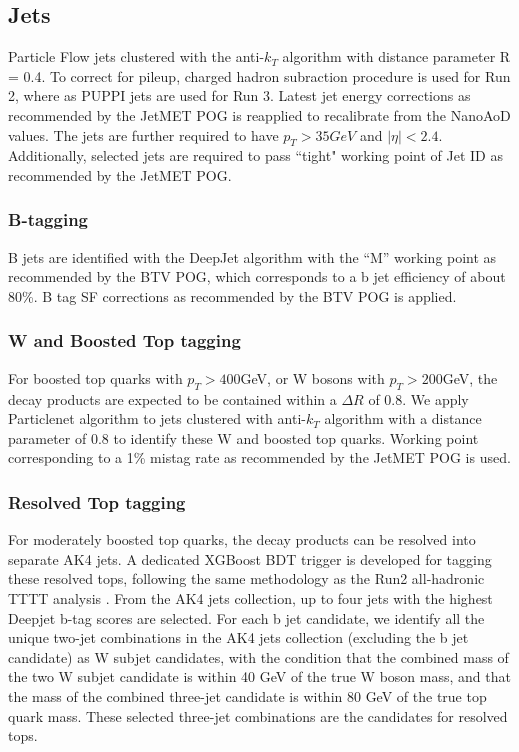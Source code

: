 \documentclass[twoside]{article}
\begin{document}
\subsection{Jets}
Particle Flow jets clustered with the anti-$k_T$ algorithm with distance parameter R = 0.4. To correct for pileup, charged hadron subraction procedure is used for Run 2, where as PUPPI jets are used for Run 3. Latest jet energy corrections as recommended by the JetMET POG is reapplied to recalibrate from the NanoAoD values. The jets are further required to have $p_T > 35 GeV$ and $\left| \eta \right| <2.4$. Additionally, selected jets are required to pass ``tight" working point of Jet ID as recommended by the JetMET POG.

\subsubsection{B-tagging}

B jets are identified with the DeepJet algorithm with the ``M'' working point as recommended by the BTV POG, which corresponds to a b jet efficiency of about 80\%. B tag SF corrections as recommended by the BTV POG is applied.

\subsubsection{W and Boosted Top tagging}

For boosted top quarks with $p_T > 400$GeV, or W bosons with $p_T > 200$GeV, the decay products are expected to be contained within a $\Delta R $ of 0.8. We apply Particlenet algorithm to jets clustered with anti-$k_T$ algorithm with a distance parameter of 0.8 to identify these W and boosted top quarks. Working point corresponding to a 1\% mistag rate as recommended by the JetMET POG is used.  

\subsubsection{Resolved Top tagging}
\label{sec:restop}

For moderately boosted top quarks, the decay products can be resolved into separate AK4 jets. A dedicated XGBoost BDT trigger is developed for tagging these resolved tops, following the same methodology as the Run2 all-hadronic TTTT analysis \cite{prev_analysis}. From the AK4 jets collection, up to four jets with the highest Deepjet b-tag scores are selected. For each b jet candidate, we identify all the unique two-jet combinations in the AK4 jets collection (excluding the b jet candidate) as  W subjet candidates, with the condition that the combined mass of the two W subjet candidate is within 40 GeV of the true W boson mass, and that the mass of the combined three-jet candidate is within 80 GeV of the true top quark mass. These selected three-jet combinations are the candidates for resolved tops. 
\end{document}

